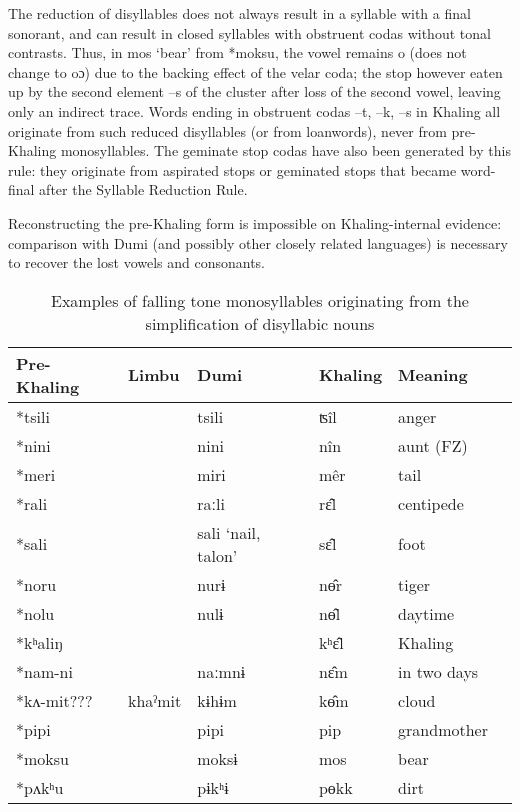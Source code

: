 \documentclass[oldfontcommands,oneside,a4paper,11pt]{article}
\newcommand{\ipa}[1]{{\phon \mbox{#1}}} %
\begin{document}
The reduction of disyllables does not always result in a syllable with a final sonorant, and can result in closed syllables with obstruent codas without tonal contrasts. Thus, in  \ipa{mos}	`bear' from \ipa{*moksu}, the vowel remains \ipa{o} (does not change to \ipa{oɔ}) due to the backing effect of the velar coda; the stop however eaten up by the second element \ipa{--s} of the cluster after loss of the second vowel, leaving only an indirect trace. Words ending in obstruent codas \ipa{--t}, \ipa{--k}, \ipa{--s}   in Khaling all originate from such reduced disyllables (or from loanwords), never from pre-Khaling monosyllables. The geminate stop codas have also been generated by this rule: they originate from aspirated stops or geminated stops that  became word-final after the Syllable Reduction Rule.

Reconstructing the pre-Khaling form is impossible on Khaling-internal evidence: comparison with Dumi (and possibly other closely related languages) is necessary to recover the lost vowels and consonants.

\begin{table}[H]
\caption{Examples of falling tone monosyllables originating from the simplification of   disyllabic nouns } \centering \label{tab:falling.reduction}
\begin{tabular}{llllll}
\toprule
Pre-Khaling	&Limbu	&Dumi	&Khaling	&Meaning\\
\midrule
\ipa{*tsili}			&&	\ipa{tsili}	&	\ipa{ʦîl}	&	anger\\
\ipa{*nini	}		&&	\ipa{nini}	&	\ipa{nîn}		&aunt (FZ)\\
\ipa{*meri}		&&		\ipa{miri}	&	\ipa{mêr}	&	tail\\
\ipa{*rali	}		&&	\ipa{raːli}	&	\ipa{rɛ̂l}		&centipede \\
\ipa{*sali	}		&&	\ipa{sali} `nail, talon'	&	\ipa{sɛ̂l}		&foot \\
\midrule
\ipa{*noru	}		&&	\ipa{nurɨ}	&	\ipa{nɵ̂r}		& tiger \\
\ipa{*nolu	}		&&	\ipa{nulɨ}	&	\ipa{nɵ̂l}		& daytime \\
\midrule
\ipa{*kʰaliŋ}				&&&	\ipa{kʰɛ‍̂l}	&	Khaling\\
\ipa{*nam-ni}	&&		\ipa{naːmnɨ	}&	\ipa{nɛ̂m}	&	in two days\\
\midrule
\ipa{*kʌ-mit}???	& \ipa{khaˀmit} & \ipa{kɨhɨm}	&	\ipa{kɵ̂m}		&cloud\\
\midrule
\ipa{*pipi} 	&   & \ipa{pipi}	&	\ipa{pip}		& grandmother \\
\ipa{*moksu} 	&   & \ipa{moksɨ}	&	\ipa{mos}		&bear \\
\ipa{*pʌkʰu} 	&   & \ipa{pɨkʰɨ}	&	\ipa{pɵkk}		& dirt \\
\bottomrule
\end{tabular}
\end{table}
\end{document}
